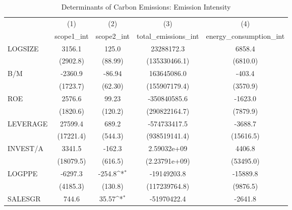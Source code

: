 \begin{table}[htbp]\centering
\def\sym#1{\ifmmode^{#1}\else\(^{#1}\)\fi}
\caption{Determinants of Carbon Emissions: Emission Intensity}
\begin{tabular}{l*{4}{c}}
\hline\hline
                    &\multicolumn{1}{c}{(1)}&\multicolumn{1}{c}{(2)}&\multicolumn{1}{c}{(3)}&\multicolumn{1}{c}{(4)}\\
                    &\multicolumn{1}{c}{scope1\_int}&\multicolumn{1}{c}{scope2\_int}&\multicolumn{1}{c}{total\_emissions\_int}&\multicolumn{1}{c}{energy\_consumption\_int}\\
\hline
LOGSIZE             &      3156.1         &       125.0         &  23288172.3         &      6858.4         \\
                    &    (2902.8)         &     (88.99)         &(135330466.1)         &    (6810.0)         \\
B/M                 &     -2360.9         &      -86.94         & 163645086.0         &      -403.4         \\
                    &    (1723.7)         &     (62.30)         &(155907179.4)         &    (3570.9)         \\
ROE                 &      2576.6         &       99.23         &-350840585.6         &     -1623.0         \\
                    &    (1820.6)         &     (120.2)         &(290822164.7)         &    (7879.9)         \\
LEVERAGE            &     27599.4         &       689.2         &-574733417.5         &     -3688.7         \\
                    &   (17221.4)         &     (544.3)         &(938519141.4)         &   (15616.5)         \\
INVEST/A            &      3341.5         &      -162.3         & 2.59032e+09         &      4406.8         \\
                    &   (18079.5)         &     (616.5)         &(2.23791e+09)         &   (53495.0)         \\
LOGPPE              &     -6297.3         &      -254.8\sym{*}  & -19149203.8         &    -15889.8         \\
                    &    (4185.3)         &     (130.8)         &(117239764.8)         &    (9876.5)         \\
SALESGR             &       744.6         &       35.57\sym{*}  & -51970422.4         &     -2641.8         \\

\end{tabular}
\end{table}
